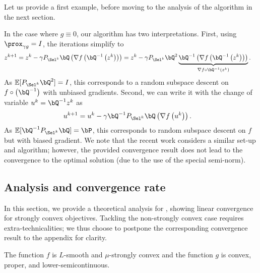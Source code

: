 Let us provide a first example, before moving to the analysis of the algorithm in the next section. 

\begin{example}
In the case where $g\equiv0$, our algorithm has two interpretations. 
First, using\;$\prox_{\gamma g} = I$, the iterations simplify to 
\begin{align*}
     z^{k+1} &= z^k - \gamma P_{\Sel^k}\bQ\left(\nabla f\left(\bQ^{-1}\left(z^k\right)\right)\right) = z^k - \gamma  P_{\Sel^k}\bQ^2 \underbrace{\bQ^{-1}  \left(\nabla f\left(\bQ^{-1}\left(z^k\right)\right)\right) }_{\nabla f\circ \bQ^{-1} (z^k)}.
\end{align*}
As $\mathbb{E}[P_{\Sel^k}\bQ^2] = I $, this corresponds to a random subspace descent on {$ f\circ \left(\bQ^{-1}\right)$} with unbiased gradients. Second, we can write it with the change of variable $u^k =\bQ^{-1} z^k $ as
\begin{align*}
  u^{k+1} &= u^k - \gamma  \bQ^{-1}  P_{\Sel^k} \bQ\left(\nabla f\left(u^k\right)\right).
\end{align*}
As $\mathbb{E} [\bQ^{-1}  P_{\Sel^k}\bQ] = \bP $, this corresponds to random subspace descent on $ f $ but with biased gradient. We note that the recent work \cite{frongillo2015convergence} considers a similar set-up and algorithm; however, the provided convergence result does not lead to the convergence to the optimal solution (due to the use of the special semi-norm).\hfill
\end{example}



\subsection{Analysis and convergence rate}\label{sec:conv}

In this section, we provide a theoretical analysis for \algo, showing linear convergence for strongly convex objectives. Tackling the non-strongly convex case requires extra-technicalities; we thus choose to postpone the corresponding convergence result to the appendix for clarity. 



\begin{assumption}\label{hyp:f}
The function $f$ is $L$-smooth and $\mu$-strongly convex and the function $g$ is convex, proper, and lower-semicontinuous.
\end{assumption}


